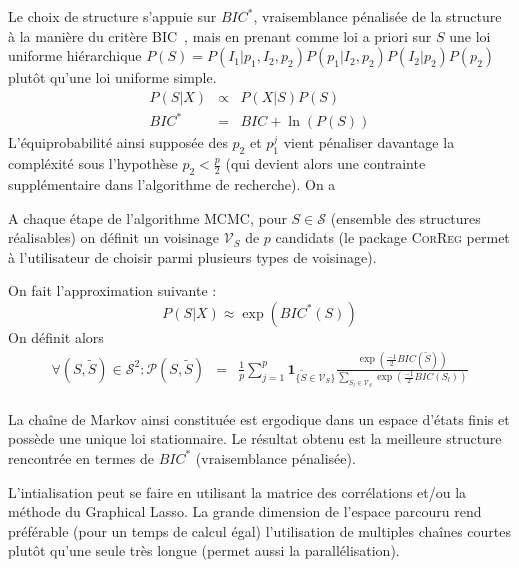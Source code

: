\documentclass[12pt]{article}
\begin{document}
		Le choix de structure s'appuie sur $BIC^*$, vraisemblance pénalisée de la structure à la manière du critère BIC~\cite{BIChuard}, mais en prenant comme loi a priori sur $S$ une loi uniforme hiérarchique $P(S)=P(I_1 | p_1,I_2,p_2)P(p_1|I_2,p_2)P(I_2|p_2)P(p_2)$ plutôt qu'une loi uniforme simple. 
		\begin{eqnarray}
		P(S|X)&\propto &P(X|S)P(S) \\
		BIC^*&=&BIC +\ln(P(S)) \label{Bicstar}
	\end{eqnarray}	
	L'équiprobabilité ainsi supposée des $p_2$ et $p_1^j$ vient pénaliser davantage la compléxité sous l'hypothèse $p_2<\frac{p}{2}$ (qui devient alors une contrainte supplémentaire dans l'algorithme de recherche). 
	On a

	A chaque étape de l'algorithme MCMC, pour $S \in \mathcal{S}$ (ensemble des structures réalisables) on définit un voisinage $\mathcal{V}_{S}$ de $p$ candidats (le package \textsc{CorReg} permet à l'utilisateur de choisir parmi plusieurs types de voisinage).
		
	On fait l'approximation suivante : 
	\begin{equation}
		P(S|X)\approx \exp(BIC^*(S))
	\end{equation}
	On définit alors
	\begin{eqnarray}
			\forall (S,\tilde{S}) \in \mathcal{S}^2 : \mathcal{P}(S,\tilde{S})&=& \frac{1}{p} \sum_{j=1}^p \mathbf{1}_{ \{\tilde{S}\in \mathcal{V}_{S}\} }\frac{\exp(\frac{-1}{2} BIC(\tilde{S}))}{\sum_{S_l\in \mathcal{V}_{S}}\exp(\frac{-1}{2} BIC(S_l))} \\
	\end{eqnarray}
	
		La chaîne de Markov ainsi constituée est ergodique dans un espace d'états finis et possède une unique loi stationnaire.
		Le résultat obtenu est la meilleure structure rencontrée en termes de $BIC^*$ (vraisemblance pénalisée). 
 
L'intialisation peut se faire en utilisant la matrice des corrélations et/ou la méthode du Graphical Lasso\cite{friedman2008sparse}.		
La grande dimension de l'espace parcouru rend préférable  (pour un temps de calcul égal) l'utilisation de multiples chaînes courtes plutôt qu'une seule très longue (permet aussi la parallélisation).
	
\end{document}
